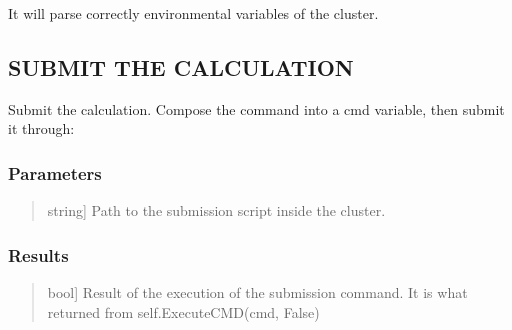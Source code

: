 \documentclass[a4paper,11pt,english]{sphinxmanual}
\begin{document}
\begin{fulllineitems}
\begin{fulllineitems}
\sphinxAtStartPar
It will parse correctly environmental variables of the cluster.

\end{fulllineitems}


\begin{fulllineitems}
\label{\detokenize{apireference:sscha.Cluster.Cluster.submit}}
\pysigstartsignatures
{}
\pysigstopsignatures

\subsection{SUBMIT THE CALCULATION}
\label{\detokenize{apireference:submit-the-calculation}}
\sphinxAtStartPar
Submit the calculation. Compose the command into a cmd variable, then submit it through:

\begin{sphinxVerbatim}[commandchars=\\\{\}]
   
\end{sphinxVerbatim}


\subsubsection{Parameters}
\label{\detokenize{apireference:id64}}\begin{quote}
\begin{description}
\sphinxlineitem{script\_localtion}{[}string{]}
\sphinxAtStartPar
Path to the submission script inside the cluster.

\end{description}
\end{quote}


\subsubsection{Results}
\label{\detokenize{apireference:id65}}\begin{quote}
\begin{description}
\sphinxlineitem{success}{[}bool{]}
\sphinxAtStartPar
Result of the execution of the submission command. 
It is what returned from self.ExecuteCMD(cmd, False)

\end{description}
\end{quote}

\end{fulllineitems}


\end{fulllineitems}
\end{document}
